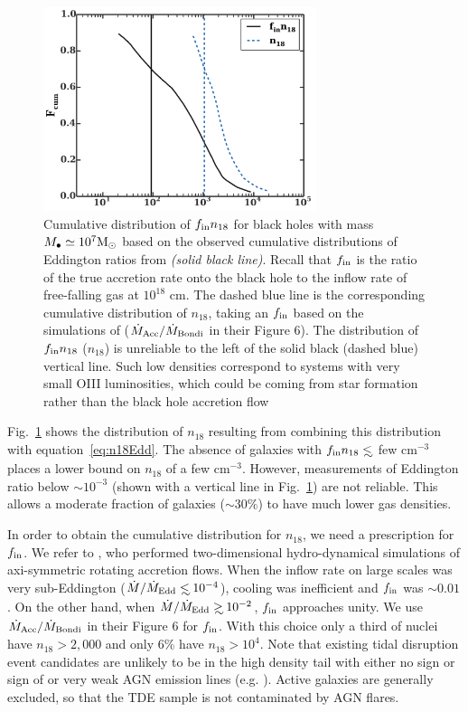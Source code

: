 \documentclass[usenatbib,fleqn]{mnras}
\newcommand\lsim{\mathrel{\rlap{\lower4pt\hbox{\hskip1pt$\sim$}}
    \raise1pt\hbox{$<$}}}
\newcommand\gsim{\mathrel{\rlap{\lower4pt\hbox{\hskip1pt$\sim$}}
    \raise1pt\hbox{$>$}}}
\newcommand{\Mbh}[1][]{M_{\bullet#1}}
\newcommand{\Msun}{{\rm M_\odot}}
\begin{document}
\begin{figure}
\includegraphics[width=8cm]{fcum_n18.pdf}
\caption{\label{fig:n18Cum} Cumulative distribution of $f_{\rm in}
  n_{18}$ for black holes with mass $\Mbh\simeq 10^{7} \Msun$ based on
  the observed cumulative distributions of Eddington ratios from
  \citet{Kauffmann&Heckman2009} {\it (solid black line)}. Recall that
  $f_{\rm in}$ is the ratio of the true accretion rate onto the black
  hole to the inflow rate of free-falling gas at $10^{18}$ cm.  The
  dashed blue line is the corresponding cumulative distribution of
  $n_{18}$, taking an $f_{\rm in}$ based on the simulations of
  \citet{Li+2013} ($\dot{M}_{\rm Acc}/\dot{M}_{\rm Bondi}$ in their
  Figure 6). The distribution of $f_{\rm in} n_{18}$ ($n_{18}$) is
  unreliable to the left of the solid black (dashed blue) vertical
  line. Such low densities correspond to systems with very small OIII
  luminosities, which could be coming from star formation rather than
  the black hole accretion flow}
\end{figure}


Fig.~\ref{fig:n18Cum} shows the distribution of $n_{18}$ resulting
from combining this distribution with equation~\eqref{eq:n18Edd}.  The
absence of galaxies with $f_{\rm in }n_{18} \lsim$ few cm$^{-3}$
places a lower bound on $n_{18}$ of a few cm$^{-3}$.  However,
measurements of Eddington ratio below $\sim 10^{-3}$ (shown with a
vertical line in Fig.~\ref{fig:n18Cum}) are not reliable. This allows a
moderate fraction of galaxies ($\sim 30\%$) to have much lower gas
densities.


In order to obtain the cumulative distribution for $n_{18}$, we need a
prescription for $f_{\rm in}$. We refer to \citet{Li+2013}, who
performed two-dimensional hydro-dynamical simulations of axi-symmetric
rotating accretion flows. When the inflow rate on large scales was
very sub-Eddington ($\dot{M}/\dot{M}_{\rm Edd} \lsim 10^{-4}$),
cooling was inefficient and $f_{\rm in}$ was $\sim 0.01$. On the other
hand, when $\dot{M}/\dot{M}_{\rm Edd}\gsim 10^{-2}$, $f_{\rm in}$
approaches unity.  We use $\dot{M}_{\rm Acc}/\dot{M}_{\rm Bondi}$ in
their Figure 6 for $f_{\rm in}$.  With this choice only a third of
nuclei have $n_{18}>2,000$ and only 6\% have $n_{18}>10^{4}$. Note
that existing tidal disruption event candidates are unlikely to be in
the high density tail with either no sign or sign of or very weak AGN
emission lines (e.g. \citealt{van-Velzen+2011, Arcavi+2014}). Active
galaxies are generally excluded, so that the TDE sample is not
contaminated by AGN flares.
\end{document}
